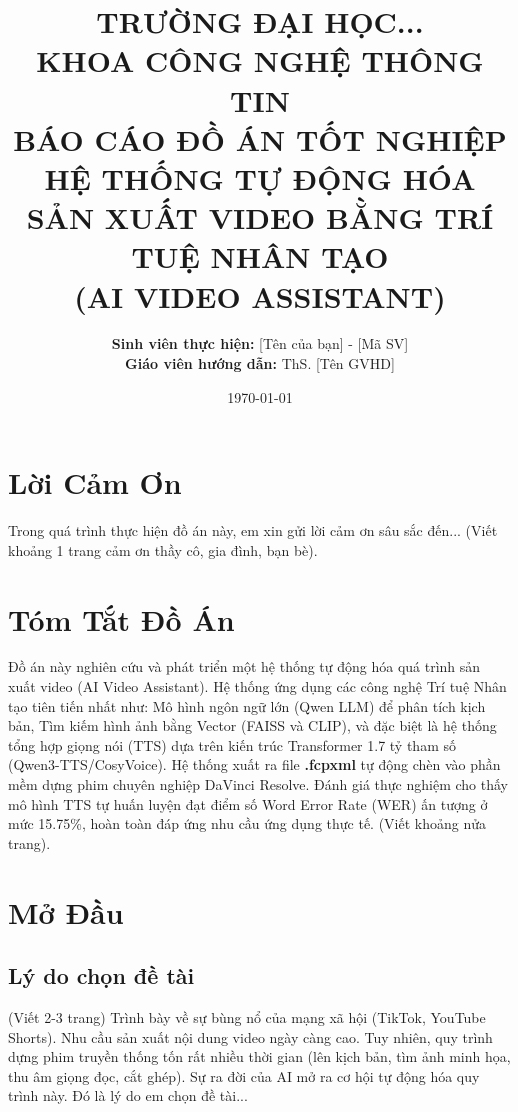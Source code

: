 \documentclass[a4paper,13pt]{report}
\title{
    \vspace{-2cm}
    \Large \textbf{TRƯỜNG ĐẠI HỌC...} \\
    \large \textbf{KHOA CÔNG NGHỆ THÔNG TIN} \\
    \vspace{3cm}
    \LARGE \textbf{BÁO CÁO ĐỒ ÁN TỐT NGHIỆP} \\
    \vspace{1cm}
    \Huge \textbf{HỆ THỐNG TỰ ĐỘNG HÓA SẢN XUẤT VIDEO BẰNG TRÍ TUỆ NHÂN TẠO} \\
    \Large \textbf{(AI VIDEO ASSISTANT)} \\
    \vspace{3cm}
}
\author{
    \textbf{Sinh viên thực hiện:} [Tên của bạn] - [Mã SV] \\
    \textbf{Giáo viên hướng dẫn:} ThS. [Tên GVHD]
}
\date{\vspace{2cm} \today}
\begin{document}
\maketitle

\chapter*{Lời Cảm Ơn}
Trong quá trình thực hiện đồ án này, em xin gửi lời cảm ơn sâu sắc đến... (Viết khoảng 1 trang cảm ơn thầy cô, gia đình, bạn bè).
\newpage

\chapter*{Tóm Tắt Đồ Án}
Đồ án này nghiên cứu và phát triển một hệ thống tự động hóa quá trình sản xuất video (AI Video Assistant). Hệ thống ứng dụng các công nghệ Trí tuệ Nhân tạo tiên tiến nhất như: Mô hình ngôn ngữ lớn (Qwen LLM) để phân tích kịch bản, Tìm kiếm hình ảnh bằng Vector (FAISS và CLIP), và đặc biệt là hệ thống tổng hợp giọng nói (TTS) dựa trên kiến trúc Transformer 1.7 tỷ tham số (Qwen3-TTS/CosyVoice). Hệ thống xuất ra file \textbf{.fcpxml} tự động chèn vào phần mềm dựng phim chuyên nghiệp DaVinci Resolve. Đánh giá thực nghiệm cho thấy mô hình TTS tự huấn luyện đạt điểm số Word Error Rate (WER) ấn tượng ở mức 15.75\%, hoàn toàn đáp ứng nhu cầu ứng dụng thực tế. (Viết khoảng nửa trang).
\newpage

\tableofcontents
\newpage
\listoffigures
\newpage
\listoftables
\newpage

\chapter{Mở Đầu}

\section{Lý do chọn đề tài}
(Viết 2-3 trang)
Trình bày về sự bùng nổ của mạng xã hội (TikTok, YouTube Shorts). Nhu cầu sản xuất nội dung video ngày càng cao. Tuy nhiên, quy trình dựng phim truyền thống tốn rất nhiều thời gian (lên kịch bản, tìm ảnh minh họa, thu âm giọng đọc, cắt ghép). Sự ra đời của AI mở ra cơ hội tự động hóa quy trình này. Đó là lý do em chọn đề tài...
\end{document}

